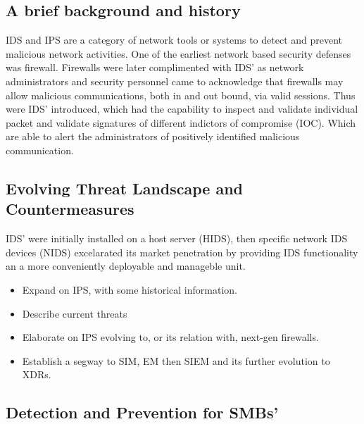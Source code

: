 \subsection{A brief background and history}

IDS and IPS are a category of network tools or systems to detect and prevent malicious network activities. One of the earliest network based security defenses was firewall. Firewalls were later complimented with IDS' as network administrators and security personnel came to acknowledge that firewalls may allow malicious  communications, both in and out bound, via valid sessions. Thus were IDS' introduced, which had the capability to inspect and validate individual packet and validate signatures of different indictors of compromise (IOC). Which are able to alert the administrators of positively identified malicious communication.

\subsection{Evolving Threat Landscape and Countermeasures}

IDS' were initially installed on a host server (HIDS), then specific network IDS devices (NIDS) excelarated its market penetration by providing IDS functionality an a more conveniently deployable and manageble unit.

\begin{followup}[to-do]
    \begin{itemize}
        \item Expand on IPS, with some historical information.
        \item Describe current threats
        \item Elaborate on IPS evolving to, or its relation with, next-gen firewalls.
        \item Establish a segway to SIM, EM then SIEM and its further evolution to XDRs.
    \end{itemize}
\end{followup}

\subsection{Detection and Prevention for SMBs'}

